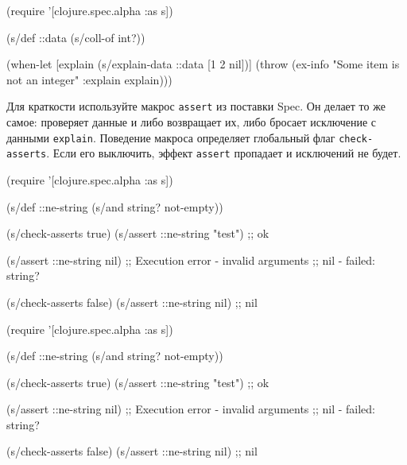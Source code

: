 \else

\begin{english}
  \begin{clojure}
(require '[clojure.spec.alpha :as s])

(s/def ::data (s/coll-of int?))

(when-let [explain (s/explain-data ::data [1 2 nil])]
  (throw (ex-info "Some item is not an integer"
                  {:explain explain})))
  \end{clojure}
\end{english}

\fi


Для краткости используйте макрос \verb|assert| из поставки Spec. Он делает то
же самое: проверяет данные и либо возвращает их, либо бросает исключение с
данными \verb|explain|. Поведение макроса определяет глобальный флаг
\verb|check-asserts|. Если его выключить, эффект \verb|assert| пропадает и
исключений не будет.

\ifx\devicetype\mobile

\begin{english}
  \begin{clojure}
(require '[clojure.spec.alpha :as s])

(s/def ::ne-string
  (s/and string? not-empty))

(s/check-asserts true)
(s/assert ::ne-string "test") ;; ok

(s/assert ::ne-string nil)
;; Execution error - invalid arguments
;; nil - failed: string?

(s/check-asserts false)
(s/assert ::ne-string nil) ;; nil
  \end{clojure}
\end{english}

\else

\begin{english}
  \begin{clojure}
(require '[clojure.spec.alpha :as s])

(s/def ::ne-string (s/and string? not-empty))

(s/check-asserts true)
(s/assert ::ne-string "test") ;; ok

(s/assert ::ne-string nil)
;; Execution error - invalid arguments
;; nil - failed: string?

(s/check-asserts false)
(s/assert ::ne-string nil) ;; nil
  \end{clojure}
\end{english}

